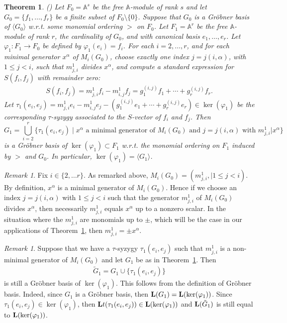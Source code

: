 \documentclass[10pt]{amsart}
\newcommand{\mba}{\mbox{$\mathbb{A}$}}
\newcommand{\lmod}{\mbox{${\bf L}$}}
\newcommand{\lt}{\mbox{${\bf L}{\rm t}$}}
\newtheorem{theorem}[cdrthm]{Theorem}
\theoremstyle{definition}
\theoremstyle{remark}
\newtheorem{remark}[cdrthm]{Remark}
\begin{document}
\begin{theorem}\label{algorithm} {\rm (\cite[Proposition~3.5]{emss})}
Let $F_0=\mba^s$ be the free $\mba$-module of rank $s$ and let
$G_0=\{f_1,\ldots ,f_r\}$ be a finite subset of
$F_0\setminus\{0\}$. Suppose that $G_0$ is a Gr\"obner basis of
$\langle G_0\rangle$ w.r.t. some monomial ordering $>$ on $F_0$. Let
$F_1=\mba^r$ be the free $\mba$-module of rank $r$, the cardinality of
$G_0$, and with canonical basis $e_1,\ldots ,e_r$. Let
$\varphi_1:F_1\rightarrow F_0$ be defined by $\varphi_1(e_i)=f_i$. For
each $i=2,\ldots ,r$, and for each minimal generator $x^{\alpha}$ of
$M_i(G_0)$, choose exactly one index $j=j(i,\alpha)$, with $1\leq
j<i$, such that $m^1_{j,i}$ divides $x^\alpha$, and compute a standard
expression for $S(f_i,f_j)$ with remainder zero:
\begin{eqnarray*}
S(f_i,f_j)=m^1_{j,i}f_i-m^1_{i,j}f_j=g_1^{(i,j)}f_1+\cdots
+g_r^{(i,j)}f_r.
\end{eqnarray*}
Let $\tau_1(e_i,e_j)=m^1_{j,i}e_i-m^1_{i,j}e_j-(g_1^{(i,j)}e_1+\cdots
+g_r^{(i,j)}e_r)\in \ker(\varphi_1)$ be the corresponding
$\tau$-syzygy associated to the $S$-vector of $f_i$ and $f_j$. Then
\begin{equation*}
G_1=\bigcup_{i=2}^{r}\{\tau_1(e_i,e_j)\!\mid\!x^\alpha\text{ a minimal generator of }M_i(G_0)\text{ and }j=j(i,\alpha)\text{ with }
m^1_{j,i}\vert x^\alpha\}
\end{equation*}
is a Gr\"obner basis of $\ker(\varphi_1)\subset F_1$ w.r.t. the
monomial ordering on $F_1$ induced by $>$ and $G_0$. In particular,
$\ker(\varphi_1)=\langle G_1\rangle$.
\end{theorem}

\begin{remark}\label{uptosign} 
Fix $i\in \{2,\ldots r\}$. As remarked above,
$M_i(G_0)=(m^1_{j,i},\mid 1\leq j<i)$. By definition, $x^{\alpha}$ is
a minimal generator of $M_i(G_0)$. Hence if we choose an index
$j=j(i,\alpha)$ with $1\leq j<i$ such that the generator $m^1_{j,i}$
of $M_i(G_0)$ divides $x^{\alpha}$, then necessarily $m^1_{j,i}$
equals $x^\alpha$ up to a nonzero scalar. In the situation where the
$m^1_{j,i}$ are monomials up to $\pm$, which will be the case in our
applications of Theorem~\ref{algorithm}, then $m^1_{j,i}=\pm
x^\alpha$.
\end{remark}

\begin{remark}\label{nonminimal}
Suppose that we have a $\tau$-syzygy $\tau_1(e_i,e_j)$ such that
$m^1_{j,i}$ is a non-minimal generator of $M_i(G_0)$ and let $G_1$ be
as in Theorem~\ref{algorithm}. Then 
\begin{eqnarray*}
\tilde{G}_1=G_1\cup \{\tau_1(e_i,e_j)\}
\end{eqnarray*}
is still a Gr\"obner basis of
$\ker(\varphi_1)$. This follows from the definition of Gr\"obner
basis. Indeed, since $G_1$ is a Gr\"obner basis, then
$\lmod(G_1)=\lmod(\ker(\varphi_1))$. Since
$\tau_1(e_i,e_j)\in\ker(\varphi_1)$, then
$\lt(\tau_1(e_i,e_j))\in\lmod(\ker(\varphi_1))$ and
$\lmod(\tilde{G}_1)$ is still equal to $\lmod(\ker(\varphi_1))$.
\end{remark}
\end{document}
